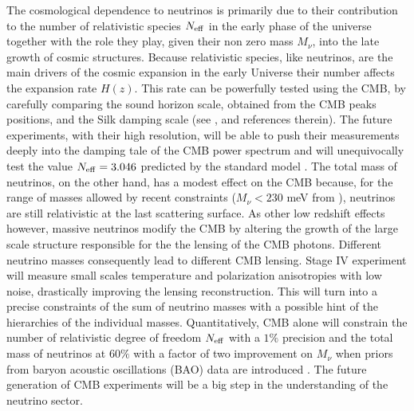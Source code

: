\documentclass[aps,prd,reprint,superscriptaddress]{revtex4-1}
\begin{document}
The cosmological dependence to neutrinos is primarily due to their contribution to the number of relativistic species $N_{\rm eff}$ in the early phase of the universe  together with the role they play, given their non zero mass $M_{\nu}$, into the late growth of cosmic structures.
Because relativistic species, like neutrinos, are the main drivers of the cosmic expansion in the early Universe their number affects the expansion rate $H(z)$. This rate can be powerfully tested using the CMB, by carefully comparing the sound horizon scale, obtained from the CMB peaks positions, and the Silk damping scale (see \cite{2013arXiv1309.5383A}, \cite{2013PhRvD..87h3008H} and references therein). 
The future experiments, with their high resolution, will be able to push their measurements deeply into the damping tale of the CMB power spectrum and will unequivocally test the value $N_{\rm eff}=3.046$ predicted by the standard model .
The total mass of neutrinos, on the other hand, has a modest effect on the CMB because, for the range of masses allowed by recent constraints ($M_{\nu}<230$ meV from \cite{2014A&A...571A..16P}), neutrinos are still relativistic at the last scattering surface. As other low redshift effects however, massive neutrinos modify the CMB by altering the growth of the large scale structure responsible for the the lensing of the CMB photons. Different neutrino masses consequently lead to different CMB lensing. Stage IV experiment will measure small scales temperature and polarization anisotropies with low noise, drastically improving the lensing reconstruction. This will turn into a  precise constraints of the sum of neutrino masses with a possible hint of the hierarchies of the individual masses. 
Quantitatively, CMB alone will constrain the number of relativistic degree of freedom $N_{\rm eff}$ with a $1\%$ precision and the total mass of neutrinos at $60\%$ with a factor of two improvement on $M_{\nu}$ when priors from baryon acoustic oscillations (BAO) data are introduced \cite{wu:2014}. The future generation of CMB experiments will be a big step in the understanding of the neutrino sector.
\end{document}
